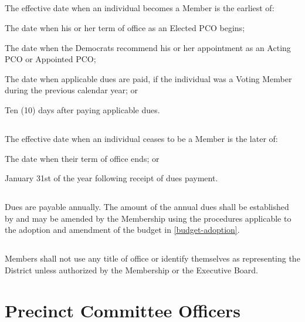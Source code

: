 \subsection{}
The effective date when an individual becomes a Member is the earliest of:
\begin{alphalist}
    \item The date when his or her term of office as an Elected PCO begins;
    \item The date when the \fortythird{}  Democrats recommend his or her appointment as an Acting PCO or
Appointed PCO;
    \item The date when applicable dues are paid, if the individual was a Voting Member during the previous
calendar year; or
    \item Ten (10) days after paying applicable dues.
\end{alphalist}

\subsection{}
The effective date when an individual ceases to be a Member is the later of:
\begin{alphalist}
    \item The date when their term of office ends; or
    \item January 31st of the year following receipt of dues payment.
\end{alphalist}

\subsection{}
Dues are payable annually. The amount of the annual dues shall be established by and may be amended by the Membership using the procedures applicable to the adoption and amendment of the budget in \autoref{budget-adoption}.

\subsection{}
Members shall not use any title of office or identify themselves as representing the \fortythird{} District  unless authorized by the Membership or the Executive Board.

\section{Precinct Committee Officers}
